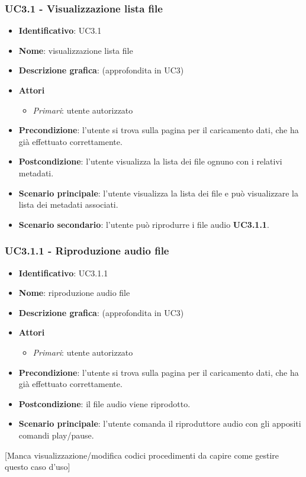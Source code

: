 \subsubsection{UC3.1 - Visualizzazione lista file}
\begin{itemize}
  \item \textbf{Identificativo}: UC3.1
  \item \textbf{Nome}: visualizzazione lista file
  \item \textbf{Descrizione grafica}: (approfondita in UC3)
  \item \textbf{Attori}
        \begin{itemize}
          \item \textit{Primari}: utente autorizzato
        \end{itemize}
  \item \textbf{Precondizione}: l'utente si trova sulla pagina per il caricamento dati, che ha già effettuato correttamente.
  \item \textbf{Postcondizione}: l'utente visualizza la lista dei file ognuno con i relativi metadati.
  \item \textbf{Scenario principale}: l'utente visualizza la lista dei file e può visualizzare la lista dei metadati associati.
  \item \textbf{Scenario secondario}: l'utente può riprodurre i file audio \textbf{UC3.1.1}.
\end{itemize}

\subsubsection{UC3.1.1 - Riproduzione audio file}
\begin{itemize}
  \item \textbf{Identificativo}: UC3.1.1
  \item \textbf{Nome}: riproduzione audio file
  \item \textbf{Descrizione grafica}: (approfondita in UC3)
  \item \textbf{Attori}
        \begin{itemize}
          \item \textit{Primari}: utente autorizzato
        \end{itemize}
  \item \textbf{Precondizione}: l'utente si trova sulla pagina per il caricamento dati, che ha già effettuato correttamente.
  \item \textbf{Postcondizione}: il file audio viene riprodotto.
  \item \textbf{Scenario principale}: l'utente comanda il riproduttore audio con gli appositi comandi play/pause.
\end{itemize}

[Manca visualizzazione/modifica codici procedimenti da capire come gestire questo caso d'uso]